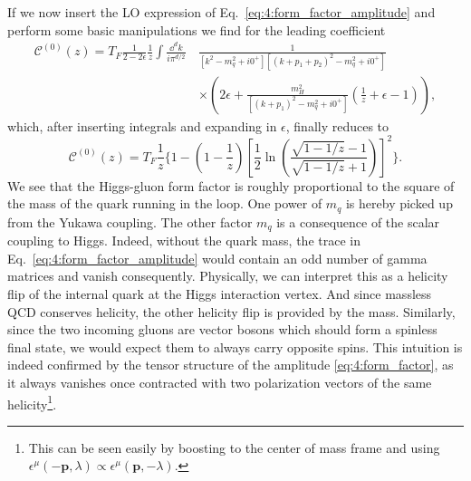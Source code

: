 If we now insert the \acs{LO} expression of Eq.~\eqref{eq:4:form_factor_amplitude} and perform some basic manipulations we find for the leading coefficient
\begin{equation}
\begin{split}
\mathcal{C}^{(0)} (z) = T_F \frac{1}{2 - 2 \epsilon} \frac{1}{z} \int \frac{\dd^d k}{i \pi^{d/2}} \,&\frac{1}{[k^2 - m_q^2 + i0^+][(k + p_1 + p_2)^2 - m_q^2 + i0^+]} \\
& \times \left( 2 \epsilon + \frac{m_H^2}{[(k + p_1)^2 - m_q^2 + i0^+]} \left(\frac{1}{z} + \epsilon - 1 \right) \right),
\label{eq:4:C0_integral_form}
\end{split}
\end{equation}
which, after inserting integrals and expanding in $\epsilon$, finally reduces to
\begin{equation}
\mathcal{C}^{(0)}(z) = T_F \frac{1}{z} \bigg \lbrace 1 - \left(1 - \frac{1}{z} \right) \left[ \frac{1}{2} \ln\! \left( \frac{\sqrt{1 - 1/z} - 1}{\sqrt{1 - 1/z} + 1} \right) \right]^2 \bigg \rbrace.
\end{equation}
We see that the Higgs-gluon form factor is roughly proportional to the square of the mass of the quark running in the loop. One power of $m_q$ is hereby picked up from the Yukawa coupling. The other factor $m_q$ is a consequence of the scalar coupling to Higgs. Indeed, without the quark mass, the trace in Eq.~\eqref{eq:4:form_factor_amplitude} would contain an odd number of gamma matrices and vanish consequently. Physically, we can interpret this as a helicity flip of the internal quark at the Higgs interaction vertex. And since massless \acs{QCD} conserves helicity, the other helicity flip is provided by the mass. Similarly, since the two incoming gluons are vector bosons which should form a spinless final state, we would expect them to always carry opposite spins. This intuition is indeed confirmed by the tensor structure of the amplitude \eqref{eq:4:form_factor}, as it always vanishes once contracted with two polarization vectors of the same helicity\footnote{This can be seen easily by boosting to the center of mass frame and using $\epsilon^\mu (-\mathbf{p}, \lambda) \propto \epsilon^\mu (\mathbf{p}, -\lambda)$.}.

